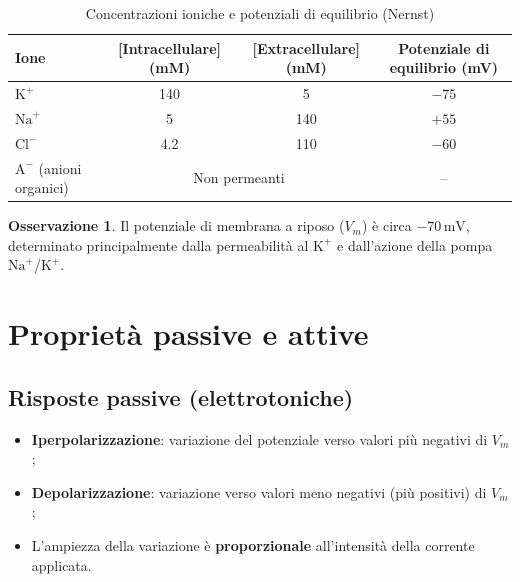 \documentclass[11pt,a4paper,italian,twoside]{report}
\theoremstyle{definition} %
\newtheorem{remark}{Osservazione}[section]
\begin{document}
\begin{table}[htbp]
  \centering
  \caption{Concentrazioni ioniche e potenziali di equilibrio (Nernst)}
  \label{tab:ioni_equilibrio}
  \begin{tabularx}{\textwidth}{l c c c}
    \toprule
    \textbf{Ione} & \textbf{[Intracellulare] (mM)} & \textbf{[Extracellulare] (mM)} & \textbf{Potenziale di equilibrio (mV)} \\
    \midrule
    \(\mathrm{K}^+\) & 140 & 5 & \(-75\) \\
    \(\mathrm{Na}^+\) & 5 & 140 & \(+55\) \\
    \(\mathrm{Cl}^-\) & 4.2 & 110 & \(-60\) \\
    \(\mathrm{A}^-\) (anioni organici) & \multicolumn{2}{c}{Non permeanti} & -- \\
    \bottomrule
  \end{tabularx}
\end{table}

\begin{remark}
Il potenziale di membrana a riposo (\(V_m\)) è circa \(-70\,\mathrm{mV}\), determinato principalmente dalla permeabilità al \(\mathrm{K}^+\) e dall'azione della pompa \(\mathrm{Na}^+\)/\(\mathrm{K}^+\).
\end{remark}

\section{Proprietà passive e attive}
\label{sec:proprieta_elettriche}

\subsection{Risposte passive (elettrotoniche)}
\label{subsec:passive}

\begin{itemize}
  \item \textbf{Iperpolarizzazione}: variazione del potenziale verso valori più negativi di \(V_m\);
  \item \textbf{Depolarizzazione}: variazione verso valori meno negativi (più positivi) di \(V_m\);
  \item L'ampiezza della variazione è \textbf{proporzionale} all'intensità della corrente applicata.
\end{itemize}
\end{document}
